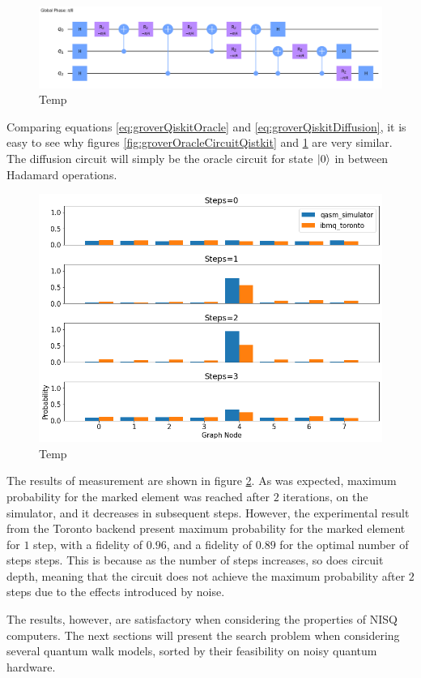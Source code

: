 \documentclass[../../dissertation.tex]{subfiles}
\begin{document}
\begin{figure}[!h]
	\centering
	\includegraphics[scale=0.25]{img/Qiskit/GroverQiskit/Circuits/GroverQiskitCircDiff_N3_M4_S3.png}
	\caption{Temp}
	\label{fig:groverDiffCircuitQistkit}
\end{figure}
Comparing equations \ref{eq:groverQiskitOracle} and \ref{eq:groverQiskitDiffusion}, it is easy to see why figures \ref{fig:groverOracleCircuitQistkit} and \ref{fig:groverDiffCircuitQistkit} are very similar. The diffusion circuit will simply be the oracle circuit for state $\ket{0}$ in between Hadamard operations.

\begin{figure}[!h]
	\centering
	\includegraphics[scale=0.40]{img/Qiskit/GroverQiskit/GroverQiskitSearch_N3_M4_S0123}
	\caption{Temp}
	\label{fig:groverQiskitDist}
\end{figure}
The results of measurement are shown in figure \ref{fig:groverQiskitDist}. As was expected, maximum probability for the marked element was reached after $2$ iterations, on the simulator, and it decreases in subsequent steps. However, the experimental result from the Toronto backend present maximum probability for the marked element for $1$ step, with a fidelity of $0.96$, and a fidelity of $0.89$ for the optimal number of steps steps. This is because as the number of steps increases, so does circuit depth, meaning that the circuit does not achieve the maximum probability after $2$ steps due to the effects introduced by noise.\par
The results, however, are satisfactory when considering the properties of NISQ computers. The next sections will present the search problem when considering several quantum walk models, sorted by their feasibility on noisy quantum hardware. 
\end{document}

